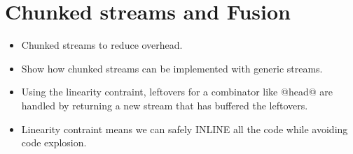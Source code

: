 \section{Chunked streams and Fusion}

\begin{itemize}
\item Chunked streams to reduce overhead.
\item Show how chunked streams can be implemented with generic streams.
\item Using the linearity contraint, leftovers for a combinator like @head@ are handled by returning a new stream that has buffered the leftovers.
\item Linearity contraint means we can safely INLINE all the code while avoiding code explosion.


\end{itemize}
